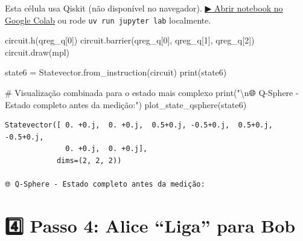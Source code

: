 \documentclass[
  brazilian,
]{report}
\newenvironment{Shaded}{\begin{snugshade}}{\end{snugshade}}
\newcommand{\BuiltInTok}[1]{\textcolor[rgb]{0.00,0.23,0.31}{#1}}
\newcommand{\CharTok}[1]{\textcolor[rgb]{0.13,0.47,0.30}{#1}}
\newcommand{\CommentTok}[1]{\textcolor[rgb]{0.37,0.37,0.37}{#1}}
\newcommand{\DecValTok}[1]{\textcolor[rgb]{0.68,0.00,0.00}{#1}}
\newcommand{\NormalTok}[1]{\textcolor[rgb]{0.00,0.23,0.31}{#1}}
\newcommand{\OperatorTok}[1]{\textcolor[rgb]{0.37,0.37,0.37}{#1}}
\newcommand{\StringTok}[1]{\textcolor[rgb]{0.13,0.47,0.30}{#1}}
\begin{document}
\begin{tcolorbox}[enhanced jigsaw, arc=.35mm, bottomrule=.15mm, bottomtitle=1mm, breakable, colback=white, colbacktitle=quarto-callout-warning-color!10!white, colframe=quarto-callout-warning-color-frame, coltitle=black, left=2mm, leftrule=.75mm, opacityback=0, opacitybacktitle=0.6, rightrule=.15mm, title=\textcolor{quarto-callout-warning-color}{\faExclamationTriangle}\hspace{0.5em}{⚛️ Célula Qiskit --- execute no Colab ou localmente}, titlerule=0mm, toprule=.15mm, toptitle=1mm]

Esta célula usa Qiskit (não disponível no navegador).
\href{https://colab.research.google.com/github/maxwellamaral/aula-quantum/blob/main/notebooks/02-teletransport.ipynb}{▶
Abrir notebook no Google Colab} ou rode \texttt{uv\ run\ jupyter\ lab}
localmente.

\begin{Shaded}
\begin{Highlighting}[]

\NormalTok{circuit.h(qreg\_q[}\DecValTok{0}\NormalTok{])}
\NormalTok{circuit.barrier(qreg\_q[}\DecValTok{0}\NormalTok{], qreg\_q[}\DecValTok{1}\NormalTok{], qreg\_q[}\DecValTok{2}\NormalTok{])}
\NormalTok{circuit.draw(}\StringTok{\textquotesingle{}mpl\textquotesingle{}}\NormalTok{)}

\NormalTok{state6 }\OperatorTok{=}\NormalTok{ Statevector.from\_instruction(circuit)}
\BuiltInTok{print}\NormalTok{(state6)}

\CommentTok{\# Visualização combinada para o estado mais complexo}
\BuiltInTok{print}\NormalTok{(}\StringTok{"}\CharTok{\textbackslash{}n}\StringTok{🌐 Q{-}Sphere {-} Estado completo antes da medição:"}\NormalTok{)}
\NormalTok{plot\_state\_qsphere(state6)}
\end{Highlighting}
\end{Shaded}

\end{tcolorbox}

\begin{verbatim}
Statevector([ 0. +0.j,  0. +0.j,  0.5+0.j, -0.5+0.j,  0.5+0.j, -0.5+0.j,
              0. +0.j,  0. +0.j],
            dims=(2, 2, 2))

🌐 Q-Sphere - Estado completo antes da medição:
\end{verbatim}

\section{4️⃣ Passo 4: Alice ``Liga'' para
Bob}\label{passo-4-alice-liga-para-bob}
\end{document}
